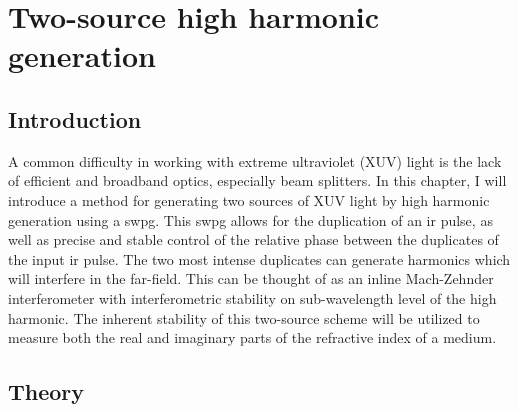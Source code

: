 \chapter{Two-source high harmonic generation}
\label{two_source}

\section{Introduction}
\label{intro_ts}

A common difficulty in working with extreme ultraviolet (XUV) light is the lack of efficient and broadband optics, especially beam splitters. In this chapter, I will introduce a method for generating two sources of XUV light by high harmonic generation using a \gls{swpg}.  This \gls{swpg} allows for the duplication of an \gls{ir} pulse, as well as precise and stable control of the relative phase between the duplicates of the input \gls{ir} pulse. The two most intense duplicates can generate harmonics which will interfere in the far-field. This can be thought of as an inline Mach-Zehnder interferometer with interferometric stability on sub-wavelength level of the high harmonic. The inherent stability of this two-source scheme will be utilized to measure both the real and imaginary parts of the refractive index of a medium.

\section{Theory}
